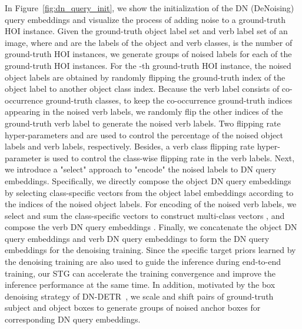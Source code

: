 \documentclass[10pt,twocolumn,letterpaper]{article}
\begin{document}
\quad In Figure~\ref{fig:dn_query_init}, we show the initialization of the DN (DeNoising) query embeddings and visualize the process of adding noise to a ground-truth HOI instance.
Given the ground-truth object label set  and verb label set  of an image, where  and  are the labels of the object and verb classes,  is the number of ground-truth HOI instances, we generate  groups of noised labels for each of the ground-truth HOI instances.
For the -th ground-truth HOI instance, the noised object labels are obtained by randomly flipping the ground-truth index of the object label  to another object class index.
Because the verb label  consists of co-occurrence ground-truth classes, to keep the co-occurrence ground-truth indices appearing in the noised verb labels, we randomly flip the other indices of the ground-truth verb label to generate the noised verb labels.
Two flipping rate hyper-parameters  and  are used to control the percentage of the noised object labels and verb labels, respectively.
Besides, a verb class flipping rate hyper-parameter  is used to control the class-wise flipping rate in the verb labels.
Next, we introduce a "select" approach to "encode" the noised labels to DN query embeddings.
Specifically, we directly compose the object DN query embeddings  by selecting class-specific vectors  from the object label embeddings  according to the indices of the noised object labels.
For encoding of the noised verb labels, we select and sum the class-specific vectors to construct multi-class vectors , and compose the verb DN query embeddings .
Finally, we concatenate the object DN query embeddings  and verb DN query embeddings  to form the DN query embeddings  for the denoising training.
Since the specific target priors learned by the denoising training are also used to guide the inference during end-to-end training, our STG can accelerate the training convergence and improve the inference performance at the same time.
In addition, motivated by the box denoising strategy of DN-DETR~\cite{Li_2022_CVPR}, we scale and shift pairs of ground-truth subject and object boxes to generate  groups of noised anchor boxes for corresponding DN query embeddings.
\end{document}
